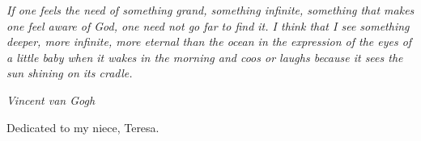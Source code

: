 
\thispagestyle{empty}


\vspace*{3cm}


\epigraph{\flushright \slshape
If one feels the need of something grand, something infinite, something that makes one feel aware of God, one need not go far to find it. I think that I see something deeper, more infinite, more eternal than the ocean in the expression of the eyes of a little baby when it wakes in the morning and coos or laughs because it sees the sun shining on its cradle.
}{ \itshape Vincent van Gogh }

\vfill

\begin{center}
Dedicated to my niece, Teresa. \\ \smallskip
{}
\end{center}
